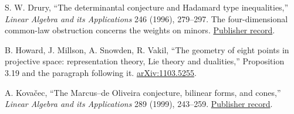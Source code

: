 \documentclass[11pt]{article}
\begin{document}
\par [3] S. W. Drury, ``The determinantal conjecture and Hadamard type inequalities,'' \emph{Linear Algebra and its Applications} 246 (1996), 279--297. The four-dimensional common-law obstruction concerns the weights on minors. \href{https://doi.org/10.1016/0024-3795(94)00361-0}{Publisher record}.
\par [4] B. Howard, J. Millson, A. Snowden, R. Vakil, ``The geometry of eight points in projective space: representation theory, Lie theory and dualities,'' Proposition 3.19 and the paragraph following it. \href{https://arxiv.org/abs/1103.5255}{arXiv:1103.5255}.
\par [5] A. Kova\v{c}ec, ``The Marcus--de Oliveira conjecture, bilinear forms, and cones,'' \emph{Linear Algebra and its Applications} 289 (1999), 243--259. \href{https://doi.org/10.1016/S0024-3795(97)10004-0}{Publisher record}.
\end{document}
